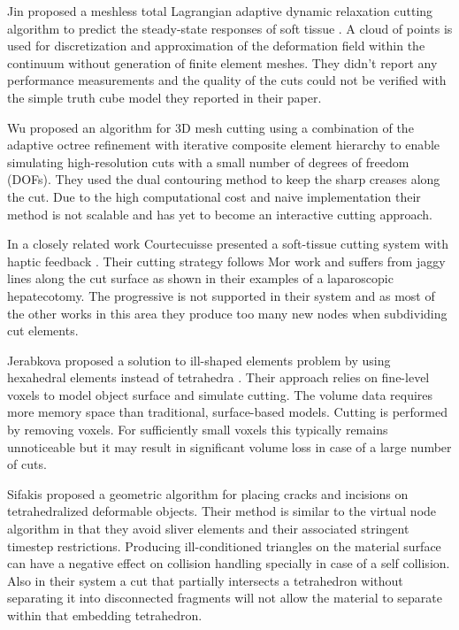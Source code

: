 Jin \etal proposed a meshless total Lagrangian adaptive dynamic relaxation cutting algorithm to predict the steady-state 
responses of soft tissue \cite{Jin2013}. A cloud of points is used for discretization and approximation of the deformation 
field within the continuum without generation of finite element meshes. They didn't report 
any performance measurements and the quality of the cuts could not be verified with the simple truth cube model they reported in their paper.
 
Wu \etal \cite{Wu2011} proposed an algorithm for 3D mesh cutting using a combination of the adaptive octree refinement with iterative composite
element hierarchy to enable simulating high-resolution cuts with a small number of degrees of freedom (DOFs). 
They used the dual contouring method \cite{Ju2002} to keep the sharp creases along the cut. Due to the high computational cost and naive implementation 
their method is not scalable and has yet to become an interactive cutting approach.

In a closely related work Courtecuisse \etal presented a soft-tissue cutting system with haptic 
feedback \cite{Courtecuisse2010a}. Their cutting strategy follows Mor \etal  \cite{Mor2000} work and 
suffers from jaggy lines along the cut surface as shown in their examples of a laparoscopic hepatecotomy.
The progressive is not supported in their system and as most of the other works in this area they produce too many
new nodes when subdividing cut elements.

Jerabkova \etal proposed a solution to ill-shaped elements problem by using hexahedral elements instead of 
tetrahedra \cite{Jerabkova2010}. Their approach relies on fine-level voxels to model object surface and simulate cutting. 
The volume data requires more memory space than traditional, surface-based models. Cutting is performed by
removing voxels. For sufficiently small voxels this typically remains unnoticeable but it may result in 
significant volume loss in case of a large number of cuts. 


Sifakis \etal \cite{Sifakis2007} proposed a geometric algorithm for placing cracks and incisions on 
tetrahedralized deformable objects. Their method is similar to the virtual node algorithm in that they avoid 
sliver elements and their associated stringent timestep restrictions. Producing ill-conditioned triangles on 
the material surface can have a negative effect on collision handling specially in case of a self collision.
Also in their system a cut that partially intersects a tetrahedron without separating it into disconnected 
fragments will not allow the material to separate within that embedding tetrahedron.

